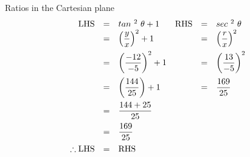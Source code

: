 \begin{wex}{Ratios in the Cartesian plane}
{
\begin{equation*}
\begin{array}{rclrcl}
 \hfill \mbox{LHS} &=&  tan~^{2}~\theta + 1 	&	\mbox{RHS}	&=&  	sec~^{2}~\theta \hfill \\
\hfill &=& \left(\dfrac{y}{x}\right)^{2} + 1  	&	&=& \left(\dfrac{r}{x}\right)^{2} \hfill \vspace{5pt} \\
\hfill&=&  \left(\dfrac{-12}{-5}\right)^{2} + 1 	&	&=& \left(\dfrac{13}{-5}\right)^{2} \hfill \vspace{5pt}\\
\hfill&=&  \left (\dfrac{144}{25}\right) + 1  	&	&=& \dfrac{169}{25} \hfill \vspace{5pt}\\
\hfill &=& \dfrac{144 + 25}{25} 		&	& & \hfill \vspace{5pt}\\
\hfill &=& \dfrac{169}{25}  			&	& & \hfill \vspace{5pt}\\
\hfill \therefore \mbox{LHS} &=& \mbox{RHS}&& \hfill
\end{array}
\end{equation*}
}
\end{wex}


